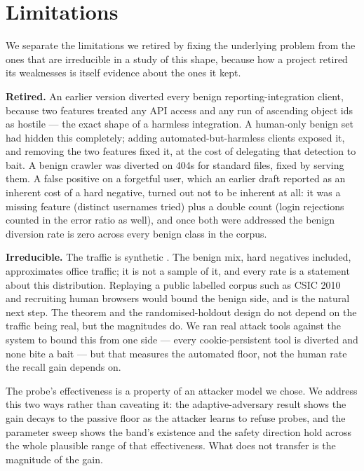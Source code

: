
\section{Limitations}

We separate the limitations we retired by fixing the underlying problem from the
ones that are irreducible in a study of this shape, because how a project retired
its weaknesses is itself evidence about the ones it kept.

\textbf{Retired.} An earlier version diverted every benign reporting-integration client,
because two features treated any API access and any run of ascending object ids as
hostile --- the exact shape of a harmless integration. A human-only benign set had
hidden this completely; adding automated-but-harmless clients exposed it, and
removing the two features fixed it, at the cost of delegating that detection to
bait. A benign crawler was diverted on 404s for standard files, fixed by serving
them. A false positive on a forgetful user, which an earlier draft reported as an
inherent cost of a hard negative, turned out not to be inherent at all: it was a
missing feature (distinct usernames tried) plus a double count (login rejections
counted in the error ratio as well), and once both were addressed the benign
diversion rate is zero across every benign class in the corpus.

\textbf{Irreducible.} The traffic is synthetic \cite{sommer2010outside}. The benign mix, hard negatives included,
approximates office traffic; it is not a sample of it, and every rate is a
statement about this distribution. Replaying a public labelled corpus such as CSIC
2010 \cite{csic2010} and recruiting human browsers would bound the benign side, and
is the natural next step. The theorem and the randomised-holdout design do not
depend on the traffic being real, but the magnitudes do. We ran real attack
tools against the system to bound this from one side --- every cookie-persistent tool
is diverted and none bite a bait --- but that measures the automated floor, not the
human rate the recall gain depends on.

The probe's effectiveness is a property of an attacker model we chose. We address
this two ways rather than caveating it: the adaptive-adversary result shows the
gain decays to the passive floor as the attacker learns to refuse probes, and the
parameter sweep shows the band's existence and the safety direction hold across the
whole plausible range of that effectiveness. What does not transfer is the
magnitude of the gain.

